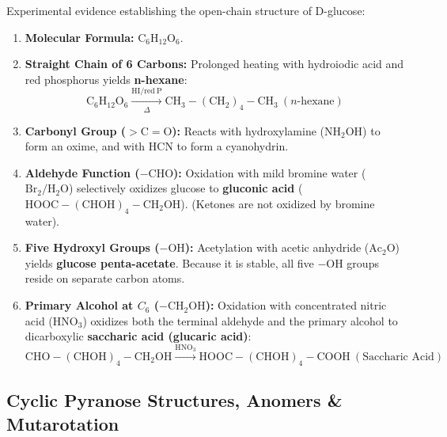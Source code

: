 \documentclass[10pt,a4paper]{article}
\begin{document}
\begin{formulabox}
Experimental evidence establishing the open-chain structure of D-glucose:
\begin{enumerate}[leftmargin=*]
  \item \textbf{Molecular Formula:} $\mathrm{C_6H_{12}O_6}$.
  \item \textbf{Straight Chain of 6 Carbons:} Prolonged heating with hydroiodic acid and red phosphorus yields \textbf{n-hexane}:
  \begin{equation}
    \mathrm{C_6H_{12}O_6} \xrightarrow[\Delta]{\mathrm{HI / red\ P}} \mathrm{CH_3-(CH_2)_4-CH_3} \ (n\text{-hexane})
  \end{equation}
  \item \textbf{Carbonyl Group ($>\mathrm{C=O}$):} Reacts with hydroxylamine ($\mathrm{NH_2OH}$) to form an oxime, and with $\mathrm{HCN}$ to form a cyanohydrin.
  \item \textbf{Aldehyde Function ($-\mathrm{CHO}$):} Oxidation with mild bromine water ($\mathrm{Br_2 / H_2O}$) selectively oxidizes glucose to \textbf{gluconic acid} ($\mathrm{HOOC-(CHOH)_4-CH_2OH}$). (Ketones are not oxidized by bromine water).
  \item \textbf{Five Hydroxyl Groups ($-\mathrm{OH}$):} Acetylation with acetic anhydride ($\mathrm{Ac_2O}$) yields \textbf{glucose penta-acetate}. Because it is stable, all five $-\mathrm{OH}$ groups reside on separate carbon atoms.
  \item \textbf{Primary Alcohol at $C_6$ ($-\mathrm{CH_2OH}$):} Oxidation with concentrated nitric acid ($\mathrm{HNO_3}$) oxidizes both the terminal aldehyde and the primary alcohol to dicarboxylic \textbf{saccharic acid (glucaric acid)}:
  \begin{equation}
    \mathrm{CHO-(CHOH)_4-CH_2OH} \xrightarrow{\mathrm{HNO_3}} \mathbf{\mathrm{HOOC-(CHOH)_4-COOH}} \ (\text{Saccharic Acid})
  \end{equation}
\end{enumerate}
\end{formulabox}

\subsection{Cyclic Pyranose Structures, Anomers \& Mutarotation}
\end{document}
